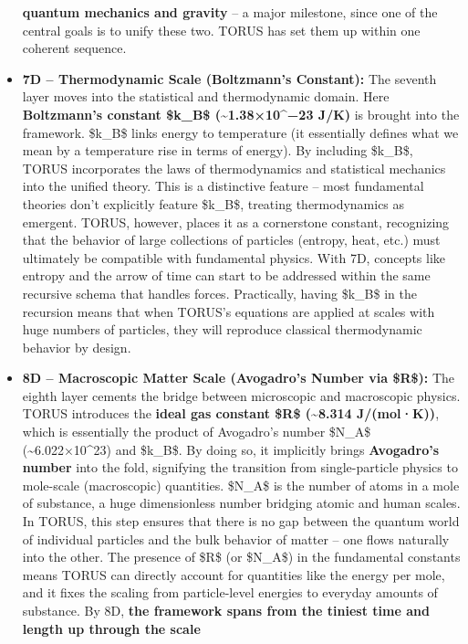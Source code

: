 \documentclass[
]{article}
\begin{document}
\begin{itemize}
  \textbf{quantum mechanics and gravity} -- a major milestone, since one
  of the central goals is to unify these two. TORUS has set them up
  within one coherent sequence.
\item
  \textbf{7D -- Thermodynamic Scale (Boltzmann's Constant):} The seventh
  layer moves into the statistical and thermodynamic domain. Here
  \textbf{Boltzmann's constant \$k\_B\$ (\textasciitilde1.38×10\^{}−23
  J/K)} is brought into the framework. \$k\_B\$ links energy to
  temperature (it essentially defines what we mean by a temperature rise
  in terms of energy). By including \$k\_B\$, TORUS incorporates the
  laws of thermodynamics and statistical mechanics into the unified
  theory. This is a distinctive feature -- most fundamental theories
  don't explicitly feature \$k\_B\$, treating thermodynamics as
  emergent. TORUS, however, places it as a cornerstone constant,
  recognizing that the behavior of large collections of particles
  (entropy, heat, etc.) must ultimately be compatible with fundamental
  physics. With 7D, concepts like entropy and the arrow of time can
  start to be addressed within the same recursive schema that handles
  forces. Practically, having \$k\_B\$ in the recursion means that when
  TORUS's equations are applied at scales with huge numbers of
  particles, they will reproduce classical thermodynamic behavior by
  design.
\item
  \textbf{8D -- Macroscopic Matter Scale (Avogadro's Number via \$R\$):}
  The eighth layer cements the bridge between microscopic and
  macroscopic physics. TORUS introduces the \textbf{ideal gas constant
  \$R\$ (\textasciitilde8.314 J/(mol·K))}, which is essentially the
  product of Avogadro's number \$N\_A\$ (\textasciitilde6.022×10\^{}23)
  and \$k\_B\$\hspace{0pt}. By doing so, it implicitly brings
  \textbf{Avogadro's number} into the fold, signifying the transition
  from single-particle physics to mole-scale (macroscopic) quantities.
  \$N\_A\$ is the number of atoms in a mole of substance, a huge
  dimensionless number bridging atomic and human scales. In TORUS, this
  step ensures that there is no gap between the quantum world of
  individual particles and the bulk behavior of matter -- one flows
  naturally into the other. The presence of \$R\$ (or \$N\_A\$) in the
  fundamental constants means TORUS can directly account for quantities
  like the energy per mole, and it fixes the scaling from particle-level
  energies to everyday amounts of substance. By 8D, \textbf{the
  framework spans from the tiniest time and length up through the scale
}
\end{itemize}
\end{document}
